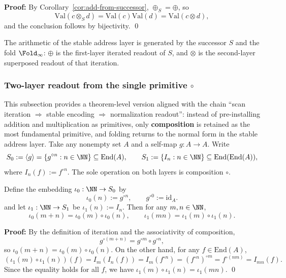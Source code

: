 \textbf{Proof:}
By Corollary~\ref{cor:add-from-successor}, $\oplus_S=\oplus$, so
\[
\mathrm{Val}(c\otimes_S d)=\mathrm{Val}(c)\mathrm{Val}(d)=\mathrm{Val}(c\otimes d),
\]
and the conclusion follows by bijectivity. \qed

\begin{corollary}\label{cor:primitive-minimal-successor}
The arithmetic of the stable address layer is generated by the successor $S$ and the fold $\Fold_\infty$: $\oplus$ is the first-layer iterated readout of $S$, and $\otimes$ is the second-layer superposed readout of that iteration.
\end{corollary}

\subsubsection{Two-layer readout from the single primitive \texorpdfstring{$\circ$}{o}}\label{subsec:arith-composition}
This subsection provides a theorem-level version aligned with the chain ``scan iteration $\Rightarrow$ stable encoding $\Rightarrow$ normalization readout'': instead of pre-installing addition and multiplication as primitives, only \textbf{composition} is retained as the most fundamental primitive, and folding returns to the normal form in the stable address layer.
Take any nonempty set $A$ and a self-map $g:A\to A$. Write
\[
S_0:=\langle g\rangle=\{g^{\circ n}:n\in\NN\}\subseteq \mathrm{End}(A),\qquad
S_1:=\{I_n:n\in\NN\}\subseteq \mathrm{End}(\mathrm{End}(A)),
\]
where $I_n(f):=f^{\circ n}$. The sole operation on both layers is composition $\circ$.

\begin{theorem}\label{thm:composition-two-layer}
Define the embedding $\iota_0:\NN\to S_0$ by
\[
\iota_0(n):=g^{\circ n},\qquad g^{\circ 0}:=\mathrm{id}_A.
\]
and let $\iota_1:\NN\to S_1$ be $\iota_1(n):=I_n$. Then for any $m,n\in\NN$,
\[
\iota_0(m+n)=\iota_0(m)\circ \iota_0(n),
\qquad
\iota_1(mn)=\iota_1(m)\circ \iota_1(n).
\]
\end{theorem}

\textbf{Proof:}
By the definition of iteration and the associativity of composition,
\[
g^{\circ(m+n)}=g^{\circ m}\circ g^{\circ n},
\]
so $\iota_0(m+n)=\iota_0(m)\circ \iota_0(n)$. On the other hand, for any $f\in\mathrm{End}(A)$,
\[
(\iota_1(m)\circ \iota_1(n))(f)=I_m(I_n(f))=I_m(f^{\circ n})=(f^{\circ n})^{\circ m}
=f^{\circ (nm)}=I_{mn}(f).
\]
Since the equality holds for all $f$, we have $\iota_1(m)\circ \iota_1(n)=\iota_1(mn)$. \qed

